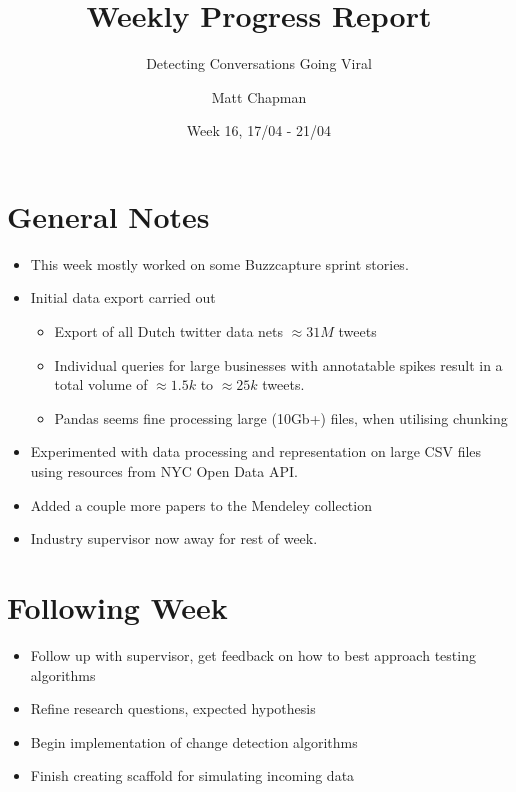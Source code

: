 \documentclass{mattreport}
\title{Weekly Progress Report}
\subtitle{Detecting Conversations Going Viral}
\date{Week 16, 17/04 - 21/04}
\author{Matt Chapman}
\begin{document}
\maketitle

\section{General Notes}

\begin{itemize}
	\item This week mostly worked on some Buzzcapture sprint stories.
	\item Initial data export carried out
	\begin{itemize}
		\item Export of all Dutch twitter data nets $\approx31M$ tweets
		\item Individual queries for large businesses with annotatable spikes result in a total volume of $\approx1.5k$
		to $\approx25k$ tweets.
		\item Pandas seems fine processing large (10Gb+) files, when utilising chunking
	\end{itemize}
	\item Experimented with data processing and representation on large CSV files using resources from NYC Open Data
	API.
	\item Added a couple more papers to the Mendeley collection
	\item Industry supervisor now away for rest of week.
\end{itemize}

\section{Following Week}

\begin{itemize}
	\item Follow up with supervisor, get feedback on how to best approach testing algorithms
	\item Refine research questions, expected hypothesis
	\item Begin implementation of change detection algorithms
	\item Finish creating scaffold for simulating incoming data
\end{itemize}

\newpage
\printbibliography
\end{document}
